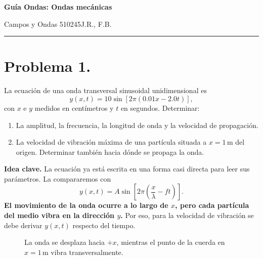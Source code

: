 \documentclass[11pt]{article}
\newcommand{\encabezado}[3]{%
{\Large\bfseries #1\par}
\vspace{2pt}
{\normalsize #2\hfill #3\par}
\vspace{6pt}\hrule\vspace{8pt}}
\newcommand{\ideaclave}[1]{%
  \par\medskip
  \noindent\textbf{Idea clave.} #1\par
}
\begin{document}
\encabezado{Guía Ondas: Ondas mecánicas}{Campos y Ondas 510245}{J.R., F.B.}
\shorthandoff{<>}

\section*{Problema 1.}
La ecuaci\'on de una onda transversal sinusoidal unidimensional es
\begin{equation*}
    y(x,t)=10\sin\left[2\pi(0.01x-2.0t)\right],
\end{equation*}
con $x$ e $y$ medidos en cent\'imetros y $t$ en segundos. Determinar:
\begin{enumerate}[label=(\alph*)]
    \item La amplitud, la frecuencia, la longitud de onda y la velocidad de propagaci\'on.
    \item La velocidad de vibraci\'on m\'axima de una part\'icula situada a $x=1\,\mathrm{m}$ del origen. Determinar tambi\'en hacia d\'onde se propaga la onda.
\end{enumerate}

\ideaclave{La ecuaci\'on ya est\'a escrita en una forma casi directa para leer sus par\'ametros. La compararemos con
\begin{equation*}
    y(x,t)=A\sin\left[2\pi\left(\frac{x}{\lambda}-ft\right)\right].
\end{equation*}
\textbf{El movimiento de la onda ocurre a lo largo de $x$, pero cada part\'icula del medio vibra en la direcci\'on $y$.} Por eso, para la velocidad de vibraci\'on se debe derivar $y(x,t)$ respecto del tiempo.}

\begin{figure}[H]
\centering
{}
\caption{La onda se desplaza hacia $+x$, mientras el punto de la cuerda en $x=1\,\mathrm{m}$ vibra transversalmente.}
\label{fig:p1_onda}
\end{figure}
\end{document}
